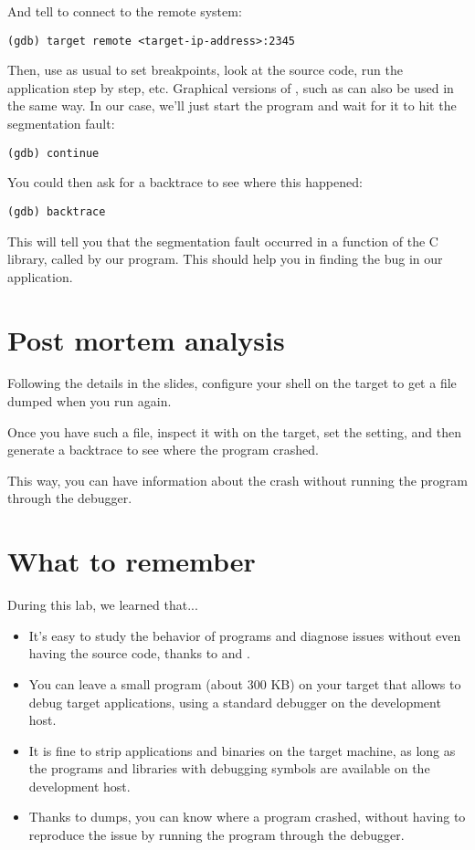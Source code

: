 And tell  to connect to the remote system:
\begin{verbatim}
(gdb) target remote <target-ip-address>:2345
\end{verbatim}

Then, use  as usual to set breakpoints, look at the source
code, run the application step by step, etc. Graphical versions of
, such as  can also be used in the same way.
In our case, we'll just start the program and wait for it to hit
the segmentation fault:
\begin{verbatim}
(gdb) continue
\end{verbatim}

You could then ask for a backtrace to see where this happened:
\begin{verbatim}
(gdb) backtrace
\end{verbatim}

This will tell you that the segmentation fault occurred in a function
of the C library, called by our program. This should help you in
finding the bug in our application.

\section{Post mortem analysis}

Following the details in the slides, configure your shell on the
target to get a  file dumped when you run 
again.

Once you have such a file, inspect it with  on
the target, set the  setting, and then generate
a backtrace to see where the program crashed.

This way, you can have information about the crash without
running the program through the debugger.

\section{What to remember}

During this lab, we learned that...
\begin{itemize}

\item It's easy to study the behavior of programs and diagnose issues
  without even having the source code, thanks to  and
  .

\item You can leave a small  program (about 300 KB) on your target
  that allows to debug target applications, using a standard 
  debugger on the development host.

\item It is fine to strip applications and binaries on the target
  machine, as long as the programs and libraries with debugging
  symbols are available on the development host.

\item Thanks to  dumps, you can know where a program crashed,
  without having to reproduce the issue by running the program through
  the debugger.

\end{itemize}
